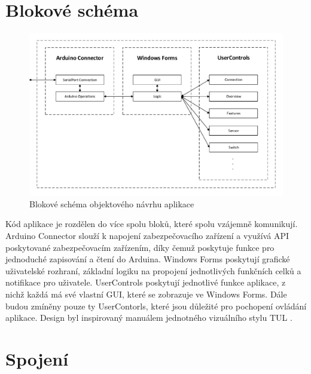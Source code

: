 \documentclass[FM,DP]{tulthesis}  %
\begin{document}
\section{Blokové schéma}

\begin{figure}[H]
\begin{center}
\includegraphics[width=\textwidth]{vector/blokoveSchemaSecurityControl.pdf}
\caption{Blokové schéma objektového návrhu aplikace}
\label{image}
\end{center}
\end{figure}

Kód aplikace je rozdělen do více spolu bloků, které spolu vzájemně komunikují. Arduino Connector slouží k napojení zabezpečovacího zařízení a využívá API poskytované zabezpečovacím zařízením, díky čemuž poskytuje funkce pro jednoduché zapisování a čtení do Arduina. Windows Forms poskytují grafické uživatelské rozhraní, základní logiku na propojení jednotlivých funkčních celků a notifikace pro uživatele. UserControls poskytují jednotlivé funkce aplikace, z nichž každá má své vlastní GUI, které se zobrazuje ve Windows Forms. Dále budou zmíněny pouze ty UserContorls, které jsou důležité pro pochopení ovládání aplikace. Design byl inspirovaný manuálem jednotného vizuálního stylu TUL \cite{TULVisual}.

\section{Spojení}
\end{document}
